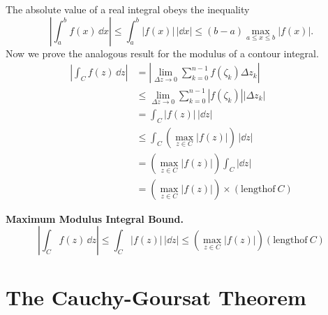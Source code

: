The absolute value of a real integral obeys the inequality
\[
\left| \int_a^b f(x) \,\dd x \right| \leq \int_a^b | f(x) | \,|\dd x|
\leq (b - a) \max_{a \leq x \leq b} |f(x)|.
\]
Now we prove the analogous result for the modulus of a contour integral.
\begin{align*}
  \left| \int_C f(z) \,\dd z \right|
  &= \left| \lim_{\Delta z \to 0} \sum_{k = 0}^{n-1} f(\zeta_k) \Delta z_k \right| 
  \\
  &\leq \lim_{\Delta z \to 0} \sum_{k = 0}^{n-1} \left| f(\zeta_k) \right|  \left| \Delta z_k \right| 
  \\
  &= \int_C |f(z)| \,|\dd z| 
  \\
  &\leq \int_C \left( \max_{z \in C} |f(z)| \right) \,|\dd z| 
  \\
  &= \left( \max_{z \in C} |f(z)| \right) \int_C |\dd z| 
  \\
  &= \left( \max_{z \in C} |f(z)| \right) \times (\mathrm{length of}\ C)
\end{align*}





\begin{Result}
  \label{max_mod_int_bound}
  \textbf{Maximum Modulus Integral Bound.}
  \[
  \left| \int_C f(z) \,\dd z \right| \leq \int_C |f(z)| \,|\dd z|
  \leq \left(\max_{z \in C} |f(z)| \right) (\mathrm{length of}\ C)
  \]
\end{Result}
















\section{The Cauchy-Goursat Theorem}




